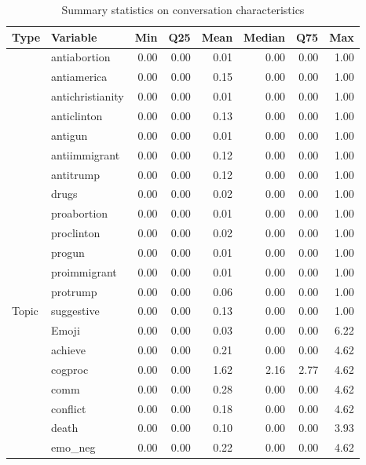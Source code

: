 \begin{table}[!h]
\centering
\caption{\label{tab:summ-tab2}Summary statistics on conversation characteristics}
\centering
\begin{tabular}[t]{l|l|r|r|r|r|r|r}
\hline
Type & Variable & Min & Q25 & Mean & Median & Q75 & Max\\
\hline
 & antiabortion & 0.00 & 0.00 & 0.01 & 0.00 & 0.00 & 1.00\\
\cline{2-8}
 & antiamerica & 0.00 & 0.00 & 0.15 & 0.00 & 0.00 & 1.00\\
\cline{2-8}
 & antichristianity & 0.00 & 0.00 & 0.01 & 0.00 & 0.00 & 1.00\\
\cline{2-8}
 & anticlinton & 0.00 & 0.00 & 0.13 & 0.00 & 0.00 & 1.00\\
\cline{2-8}
 & antigun & 0.00 & 0.00 & 0.01 & 0.00 & 0.00 & 1.00\\
\cline{2-8}
 & antiimmigrant & 0.00 & 0.00 & 0.12 & 0.00 & 0.00 & 1.00\\
\cline{2-8}
 & antitrump & 0.00 & 0.00 & 0.12 & 0.00 & 0.00 & 1.00\\
\cline{2-8}
 & drugs & 0.00 & 0.00 & 0.02 & 0.00 & 0.00 & 1.00\\
\cline{2-8}
 & proabortion & 0.00 & 0.00 & 0.01 & 0.00 & 0.00 & 1.00\\
\cline{2-8}
 & proclinton & 0.00 & 0.00 & 0.02 & 0.00 & 0.00 & 1.00\\
\cline{2-8}
 & progun & 0.00 & 0.00 & 0.01 & 0.00 & 0.00 & 1.00\\
\cline{2-8}
 & proimmigrant & 0.00 & 0.00 & 0.01 & 0.00 & 0.00 & 1.00\\
\cline{2-8}
 & protrump & 0.00 & 0.00 & 0.06 & 0.00 & 0.00 & 1.00\\
\cline{2-8}
\multirow{-14}{*}{\raggedright\arraybackslash Topic} & suggestive & 0.00 & 0.00 & 0.13 & 0.00 & 0.00 & 1.00\\
\cline{1-8}
 & Emoji & 0.00 & 0.00 & 0.03 & 0.00 & 0.00 & 6.22\\
\cline{2-8}
 & achieve & 0.00 & 0.00 & 0.21 & 0.00 & 0.00 & 4.62\\
\cline{2-8}
 & cogproc & 0.00 & 0.00 & 1.62 & 2.16 & 2.77 & 4.62\\
\cline{2-8}
 & comm & 0.00 & 0.00 & 0.28 & 0.00 & 0.00 & 4.62\\
\cline{2-8}
 & conflict & 0.00 & 0.00 & 0.18 & 0.00 & 0.00 & 4.62\\
\cline{2-8}
 & death & 0.00 & 0.00 & 0.10 & 0.00 & 0.00 & 3.93\\
\cline{2-8}
 & emo\_neg & 0.00 & 0.00 & 0.22 & 0.00 & 0.00 & 4.62\\

\end{tabular}
\end{table}
